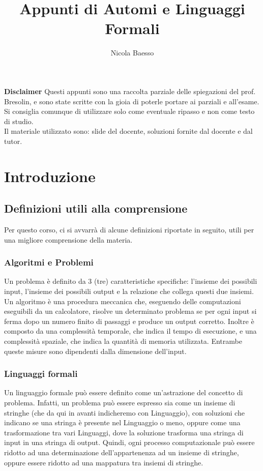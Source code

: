 \documentclass[]{article}
\title{Appunti di Automi e Linguaggi Formali}
\author{Nicola Baesso}
\begin{document}
	\maketitle
	
	\newpage
	\tableofcontents
	\newpage
	
	\textbf{Disclaimer}
	\newline
	\newline
	Questi appunti sono una raccolta parziale delle spiegazioni del prof. Bresolin, e sono state scritte con la gioia di poterle portare ai parziali e all'esame. Si consiglia comunque di utilizzare solo come eventuale ripasso e non come testo di studio.\\
	Il materiale utilizzato sono: slide del docente, soluzioni fornite dal docente e dal tutor.
	\newpage
	\section{Introduzione}
		\subsection{Definizioni utili alla comprensione}
			Per questo corso, ci si avvarrà di alcune definizioni riportate in seguito, utili per una migliore comprensione della materia.
			\subsubsection{Algoritmi e Problemi}
				Un problema è definito da 3 (tre) caratteristiche specifiche: l'insieme dei possibili input, l'insieme dei possibili output e la relazione che collega questi due insiemi.
				\newline
				Un algoritmo è una procedura meccanica che, eseguendo delle computazioni eseguibili da un calcolatore, risolve un determinato problema se per ogni input si ferma dopo un numero finito di passaggi e produce un output corretto.
				\newline Inoltre è composto da una complessità temporale, che indica il tempo di esecuzione, e una complessità spaziale, che indica la quantità di memoria utilizzata. Entrambe queste misure sono dipendenti dalla dimensione dell'input.
			\subsubsection{Linguaggi formali}
				Un linguaggio formale può essere definito come un'astrazione del concetto di problema. 
				\newline
				Infatti, un problema può essere espresso sia come un insieme di stringhe (che da qui in avanti indicheremo con Linguaggio), con soluzioni che indicano se una stringa è presente nel Linguaggio o meno, oppure come una trasformazione tra vari Linguaggi, dove la soluzione trasforma una stringa di input in una stringa di output.
				\newline
				Quindi, ogni processo computazionale può essere ridotto ad una determinazione dell'appartenenza ad un insieme di stringhe, oppure essere ridotto ad una mappatura tra insiemi di stringhe.
\end{document}

